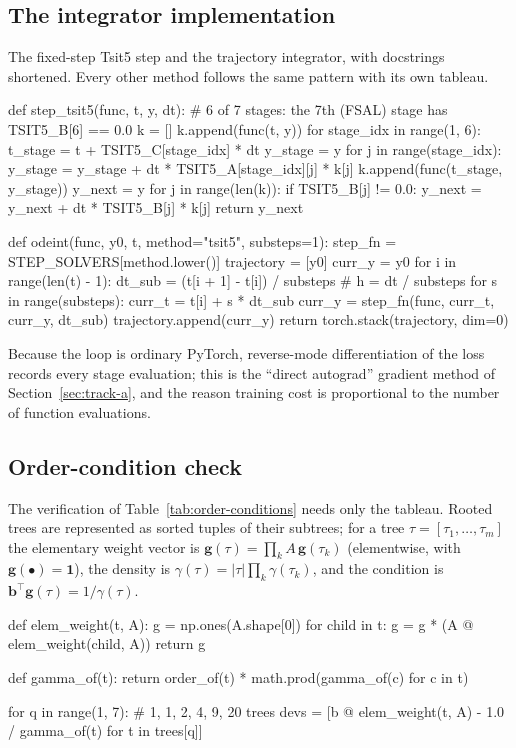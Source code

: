 \subsection{The integrator implementation}

The fixed-step Tsit5 step and the trajectory integrator, with docstrings
shortened. Every other method follows the same pattern with its own
tableau.

\begin{pycode}
def step_tsit5(func, t, y, dt):
    # 6 of 7 stages: the 7th (FSAL) stage has TSIT5_B[6] == 0.0
    k = []
    k.append(func(t, y))
    for stage_idx in range(1, 6):
        t_stage = t + TSIT5_C[stage_idx] * dt
        y_stage = y
        for j in range(stage_idx):
            y_stage = y_stage + dt * TSIT5_A[stage_idx][j] * k[j]
        k.append(func(t_stage, y_stage))
    y_next = y
    for j in range(len(k)):
        if TSIT5_B[j] != 0.0:
            y_next = y_next + dt * TSIT5_B[j] * k[j]
    return y_next
\end{pycode}

\begin{pycode}
def odeint(func, y0, t, method="tsit5", substeps=1):
    step_fn = STEP_SOLVERS[method.lower()]
    trajectory = [y0]
    curr_y = y0
    for i in range(len(t) - 1):
        dt_sub = (t[i + 1] - t[i]) / substeps     # h = dt / substeps
        for s in range(substeps):
            curr_t = t[i] + s * dt_sub
            curr_y = step_fn(func, curr_t, curr_y, dt_sub)
        trajectory.append(curr_y)
    return torch.stack(trajectory, dim=0)
\end{pycode}

Because the loop is ordinary PyTorch, reverse-mode differentiation of the loss
records every stage evaluation; this is the ``direct autograd'' gradient
method of Section~\ref{sec:track-a}, and the reason training cost is
proportional to the number of function evaluations.

\subsection{Order-condition check}

The verification of Table~\ref{tab:order-conditions} needs only the
tableau. Rooted trees are represented as sorted tuples of their subtrees;
for a tree $\tau=[\tau_1,\dots,\tau_m]$ the elementary weight vector is
$\mathbf{g}(\tau)=\prod_k A\,\mathbf{g}(\tau_k)$ (elementwise, with
$\mathbf{g}(\bullet)=\mathbf{1}$), the density is
$\gamma(\tau)=|\tau|\prod_k\gamma(\tau_k)$, and the condition is
$\mathbf{b}^\top\mathbf{g}(\tau)=1/\gamma(\tau)$.

\begin{pycode}
def elem_weight(t, A):
    g = np.ones(A.shape[0])
    for child in t:
        g = g * (A @ elem_weight(child, A))
    return g

def gamma_of(t):
    return order_of(t) * math.prod(gamma_of(c) for c in t)

for q in range(1, 7):                  # 1, 1, 2, 4, 9, 20 trees
    devs = [b @ elem_weight(t, A) - 1.0 / gamma_of(t) for t in trees[q]]
\end{pycode}
